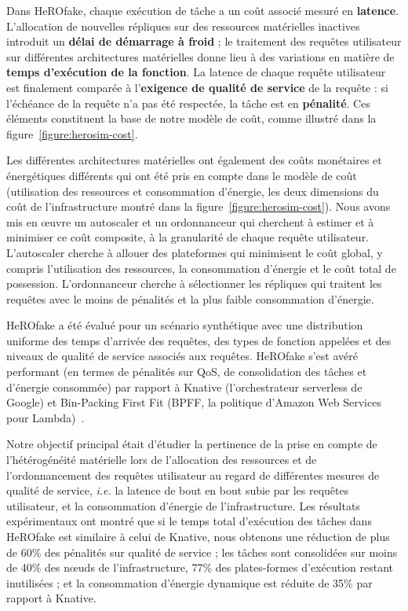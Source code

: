Dans HeROfake, chaque exécution de tâche a un coût associé mesuré en \textbf{latence}. L'allocation de nouvelles répliques sur des ressources matérielles inactives introduit un \textbf{délai de démarrage à froid} ; le traitement des requêtes utilisateur sur différentes architectures matérielles donne lieu à des variations en matière de \textbf{temps d'exécution de la fonction}. La latence de chaque requête utilisateur est finalement comparée à l'\textbf{exigence de qualité de service} de la requête : si l'échéance de la requête n'a pas été respectée, la tâche est en \textbf{pénalité}. Ces éléments constituent la base de notre modèle de coût, comme illustré dans la figure~\ref{figure:herosim-cost}.

Les différentes architectures matérielles ont également des coûts monétaires et énergétiques différents qui ont été pris en compte dans le modèle de coût (utilisation des ressources et consommation d'énergie, les deux dimensions du coût de l'infrastructure montré dans la figure~\ref{figure:herosim-cost}). Nous avons mis en œuvre un autoscaler et un ordonnanceur qui cherchent à estimer et à minimiser ce coût composite, à la granularité de chaque requête utilisateur. L'autoscaler cherche à allouer des plateformes qui minimisent le coût global, y compris l'utilisation des ressources, la consommation d'énergie et le coût total de possession. L'ordonnanceur cherche à sélectionner les répliques qui traitent les requêtes avec le moins de pénalités et la plus faible consommation d'énergie.

HeROfake a été évalué pour un scénario synthétique avec une distribution uniforme des temps d'arrivée des requêtes, des types de fonction appelées et des niveaux de qualité de service associés aux requêtes. HeROfake s'est avéré performant (en termes de pénalités sur \gls{QoS}, de consolidation des tâches et d'énergie consommée) par rapport à Knative (l'orchestrateur serverless de Google) et Bin-Packing First Fit (\gls{BPFF}, la politique d'Amazon Web Services pour Lambda)~\cite{aws-lambda, herofake}.

Notre objectif principal était d'étudier la pertinence de la prise en compte de l'hétérogénéité matérielle lors de l'allocation des ressources et de l'ordonnancement des requêtes utilisateur au regard de différentes mesures de qualité de service, \textit{i.e.} la latence de bout en bout subie par les requêtes utilisateur, et la consommation d'énergie de l'infrastructure. Les résultats expérimentaux ont montré que si le temps total d'exécution des tâches dans HeROfake est similaire à celui de Knative, nous obtenons une réduction de plus de 60\% des pénalités sur qualité de service ; les tâches sont consolidées sur moins de 40\% des nœuds de l'infrastructure, 77\% des plates-formes d'exécution restant inutilisées ; et la consommation d'énergie dynamique est réduite de 35\% par rapport à Knative.

